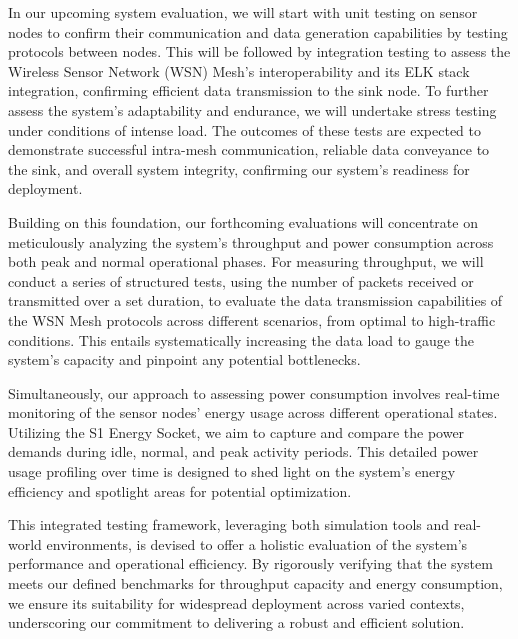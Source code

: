 In our upcoming system evaluation, we will start with unit testing on sensor nodes to confirm their communication and data generation capabilities by testing protocols between nodes. This will be followed by integration testing to assess the Wireless Sensor Network (WSN) Mesh's interoperability and its ELK stack integration, confirming efficient data transmission to the sink node. To further assess the system's adaptability and endurance, we will undertake stress testing under conditions of intense load. The outcomes of these tests are expected to demonstrate successful intra-mesh communication, reliable data conveyance to the sink, and overall system integrity, confirming our system's readiness for deployment.

Building on this foundation, our forthcoming evaluations will concentrate on meticulously analyzing the system's throughput and power consumption across both peak and normal operational phases. For measuring throughput, we will conduct a series of structured tests, using the number of packets received or transmitted over a set duration, to evaluate the data transmission capabilities of the WSN Mesh protocols across different scenarios, from optimal to high-traffic conditions. This entails systematically increasing the data load to gauge the system's capacity and pinpoint any potential bottlenecks.

Simultaneously, our approach to assessing power consumption involves real-time monitoring of the sensor nodes' energy usage across different operational states. Utilizing the S1 Energy Socket, we aim to capture and compare the power demands during idle, normal, and peak activity periods. This detailed power usage profiling over time is designed to shed light on the system's energy efficiency and spotlight areas for potential optimization.

This integrated testing framework, leveraging both simulation tools and real-world environments, is devised to offer a holistic evaluation of the system's performance and operational efficiency. By rigorously verifying that the system meets our defined benchmarks for throughput capacity and energy consumption, we ensure its suitability for widespread deployment across varied contexts, underscoring our commitment to delivering a robust and efficient solution.



